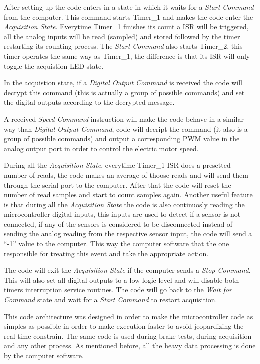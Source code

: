 	After setting up the code enters in a state in which it waits for a \textit{Start Command} from the computer. This command starts Timer\_1 and makes the code enter the \textit{Acquisition State}. Everytime Timer\_1 finishes its count a ISR will be triggered, all the analog inputs will be read (sampled) and stored followed by the timer restarting its counting process. The \textit{Start Command} also starts Timer\_2, this timer operates the same way as Timer\_1, the difference is that its ISR will only toggle the acquistion LED state.
	\par
	In the acquistion state, if a \textit{Digital Output Command} is received the code will decrypt this command (this is actually a group of possible commands) and set the digital outputs according to the decrypted message.
	\par
	A received \textit{Speed Command} instruction will make the code behave in a similar way than \textit{Digital Output Command}, code will decript the command (it also is a group of possible commands) and output a corresponding PWM value in the analog output port in order to control the electric motor speed.
	\par
	During all the \textit{Acquisition State}, everytime Timer\_1 ISR does a presetted number of reads, the code makes an average of thoose reads and will send them through the serial port to the computer. After that the code will reset the number of read samples and start to count samples again. Another useful feature is that during all the \textit{Acquisition State} the code is also continuosly reading the microcontroller digital inputs, this inputs are used to detect if a sensor is not connected, if any of the sensors is considered to be disconnected instead of sending the analog reading from the respective sensor input, the code will send a ``-1'' value to the computer. This way the computer software that the one responsible for treating this event and take the appropriate action.
	\par
	The code will exit the \textit{Acquisition State} if the computer sends a \textit{Stop Command}. This will also set all digital outputs to a low logic level and will disable both timers interruption service routines. The code will go back to the \textit{Wait for Command} state and wait for a \textit{Start Command} to restart acquisition. 
	\par
	This code architecture was designed in order to make the microcontroller code as simples as possible in order to make execution faster to avoid jeopardizing the real-time constrain. The same code is used during brake tests, during acquisition and any other process. As mentioned before, all the heavy data processing is done by the computer software.